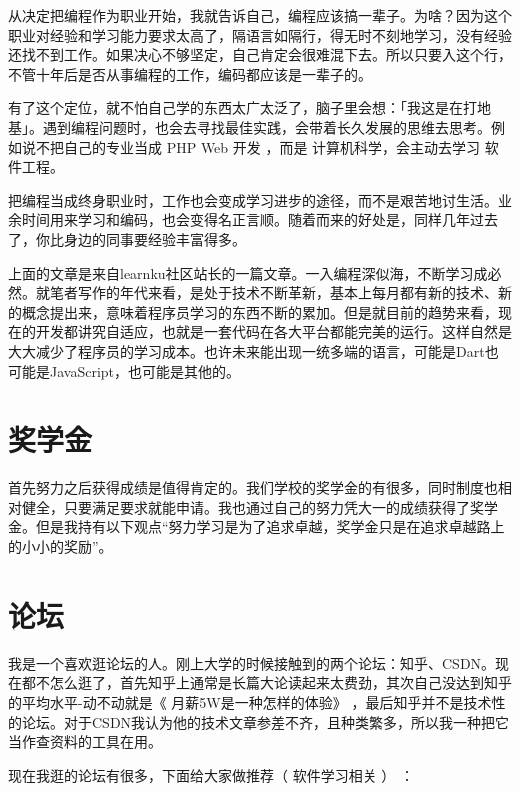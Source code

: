 \documentclass[cn,11pt]{elegantbook}
\begin{document}
从决定把编程作为职业开始，我就告诉自己，编程应该搞一辈子。为啥？因为这个职业对经验和学习能力要求太高了，隔语言如隔行，得无时不刻地学习，没有经验还找不到工作。如果决心不够坚定，自己肯定会很难混下去。所以只要入这个行，不管十年后是否从事编程的工作，编码都应该是一辈子的。

有了这个定位，就不怕自己学的东西太广太泛了，脑子里会想：「我这是在打地基」。遇到编程问题时，也会去寻找最佳实践，会带着长久发展的思维去思考。例如说不把自己的专业当成 PHP Web 开发 ，而是 计算机科学，会主动去学习 软件工程。

把编程当成终身职业时，工作也会变成学习进步的途径，而不是艰苦地讨生活。业余时间用来学习和编码，也会变得名正言顺。随着而来的好处是，同样几年过去了，你比身边的同事要经验丰富得多。

上面的文章是来自learnku社区站长的一篇文章。一入编程深似海，不断学习成必然。就笔者写作的年代来看，是处于技术不断革新，基本上每月都有新的技术、新的概念提出来，意味着程序员学习的东西不断的累加。但是就目前的趋势来看，现在的开发都讲究自适应，也就是一套代码在各大平台都能完美的运行。这样自然是大大减少了程序员的学习成本。也许未来能出现一统多端的语言，可能是Dart也可能是JavaScript，也可能是其他的。


\section{奖学金}

首先努力之后获得成绩是值得肯定的。我们学校的奖学金的有很多，同时制度也相对健全，只要满足要求就能申请。我也通过自己的努力凭大一的成绩获得了奖学金。但是我持有以下观点“努力学习是为了追求卓越，奖学金只是在追求卓越路上的小小的奖励”。

\section{论坛}
我是一个喜欢逛论坛的人。刚上大学的时候接触到的两个论坛：知乎、CSDN。现在都不怎么逛了，首先知乎上通常是长篇大论读起来太费劲，其次自己没达到知乎的平均水平-动不动就是《 月薪5W是一种怎样的体验》 ，最后知乎并不是技术性的论坛。对于CSDN我认为他的技术文章参差不齐，且种类繁多，所以我一种把它当作查资料的工具在用。

现在我逛的论坛有很多，下面给大家做推荐（ 软件学习相关 ） ：
\end{document}
